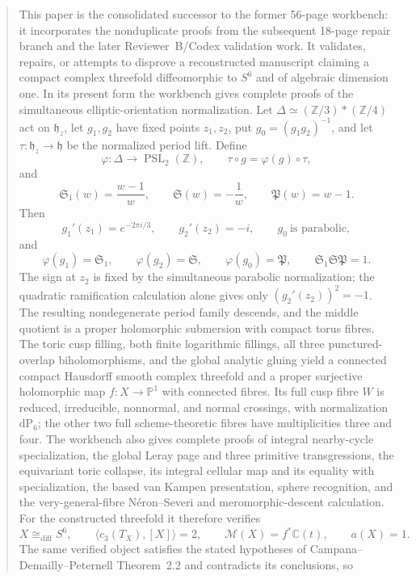 \documentclass[11pt,letterpaper]{article}
\theoremstyle{definition}
\theoremstyle{remark}
\begin{document}
\begin{abstract}
This paper is the consolidated successor to the former 56-page workbench: it
incorporates the nonduplicate proofs from the subsequent 18-page repair branch
and the later Reviewer~B/Codex validation work.  It
validates, repairs, or attempts to disprove a reconstructed
manuscript claiming a compact complex threefold diffeomorphic to $S^6$ and
 of algebraic dimension one.  In its present form the workbench gives complete
 proofs of the simultaneous elliptic-orientation normalization.  Let
 \(\Delta\simeq(\mathbb Z/3)*(\mathbb Z/4)\) act on \(\mathfrak h_z\), let
 \(g_1,g_2\) have fixed points \(z_1,z_2\), put
 \(g_0=(g_1g_2)^{-1}\), and let
 \(\tau:\mathfrak h_z\to\mathfrak h\) be the normalized period lift.  Define
 \[
  \varphi:\Delta\longrightarrow\operatorname{PSL}_2(\mathbb Z),\qquad
  \tau\circ g=\varphi(g)\circ\tau,
 \]
 and
 \[
  \mathfrak S_1(w)=\frac{w-1}{w},\qquad
  \mathfrak S(w)=-\frac1w,\qquad \mathfrak P(w)=w-1.
 \]
 Then
 \[
  g_1'(z_1)=e^{-2\pi i/3},\qquad g_2'(z_2)=-i,\qquad
  g_0\ \text{is parabolic},
 \]
 and
 \[
  \varphi(g_1)=\mathfrak S_1,\qquad
  \varphi(g_2)=\mathfrak S,\qquad
  \varphi(g_0)=\mathfrak P,\qquad
  \mathfrak S_1\mathfrak S\mathfrak P=1.
 \]
 The sign at \(z_2\) is fixed by the simultaneous parabolic normalization;
 the quadratic ramification calculation alone gives only
 \((g_2'(z_2))^2=-1\).  The resulting nondegenerate period family descends,
 and the middle quotient is a proper holomorphic submersion with compact torus
 fibres.  The toric cusp filling, both finite logarithmic fillings, all three
 punctured-overlap biholomorphisms, and the global analytic gluing yield a
 connected compact Hausdorff smooth complex threefold and a proper surjective
 holomorphic map \(f:X\to\mathbb P^1\) with connected fibres.  Its full cusp
 fibre \(W\) is reduced, irreducible, nonnormal, and normal crossings, with
 normalization \(\mathrm{dP}_6\); the other two full scheme-theoretic fibres
 have multiplicities three and four.  The workbench also gives complete proofs
 of integral nearby-cycle specialization, the global Leray page and three
 primitive transgressions, the equivariant toric collapse, its integral
 cellular map and its equality with specialization, the based van Kampen
 presentation, sphere recognition, and the very-general-fibre N\'eron--Severi
 and meromorphic-descent calculation.  For the constructed threefold it
 therefore verifies
\[
X\cong_{\mathrm{diff}}S^6,\qquad
\langle c_3(T_X),[X]\rangle=2,\qquad
\mathcal M(X)=f^*\mathbb C(t),\qquad a(X)=1.
\]
The same verified object satisfies the stated hypotheses of
Campana--Demailly--Peternell Theorem~2.2 and contradicts its conclusions, so

\end{abstract}
\end{document}
